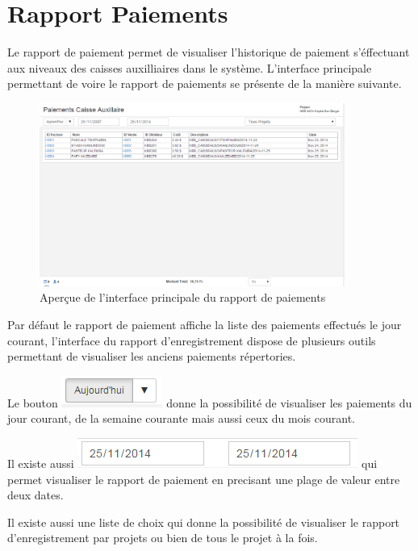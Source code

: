 \documentclass[12pt,a4paper]{report}
\begin{document}
\newpage

\newpage
\section{Rapport Paiements}
Le rapport de paiement permet de visualiser l'historique de paiement s'éffectuant aux niveaux des caisses auxilliaires dans le système. L'interface principale permettant de voire le rapport de paiements se présente de la manière suivante. 

\begin{figure}[h]
\begin{center}
\includegraphics[width=10cm]{pic/rapportCaisseAux.png}
\end{center}
\caption{Aperçue de l'interface principale du rapport de paiements}
\label{Aperçue de l'interface principale du rapport de paiements}
\end{figure}

Par défaut le rapport de paiement affiche la liste des paiements effectués le jour courant, l'interface du rapport d'enregistrement dispose de plusieurs outils permettant de visualiser les anciens paiements répertories.

Le bouton \includegraphics[scale=0.7]{pic/Todays.png} donne la possibilité de visualiser les paiements du jour courant, de la semaine courante mais aussi ceux du mois courant. 

Il existe aussi  \includegraphics[scale=0.7]{pic/PlageTimes.png} qui permet visualiser le rapport de paiement en precisant une plage de valeur entre deux dates.

Il existe aussi une liste de choix qui donne la possibilité de visualiser le rapport d'enregistrement par projets ou bien de tous le projet à la fois.
\end{document}
